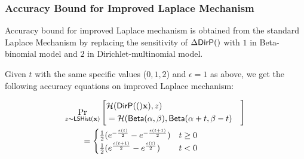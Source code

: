 \documentclass{article}
\begin{document}
\subsubsection{Accuracy Bound for Improved Laplace Mechanism}
\label{subsec_accuracy_lap}
Accuracy bound for improved Laplace mechanism is obtained from the standard Laplace Mechanism by replacing the sensitivity of $\Delta \bysinfer$ with $1$ in Beta-binomial model and $2$ in Dirichlet-multinomial model.

Given $t$ with the same specific values ($0,1,2$) and $\epsilon = 1$ as above, we get the following accuracy equations on improved Laplace mechanism:

\begin{align*}
&
\ilapmechPr{\dataobs}{
\begin{aligned}
\lefteqn{\hellinger(\bysinfer(\dataobs), z )}\\ 
&= \hellinger(\betad(\alpha, \beta), \betad(\alpha + t, \beta - t)
\end{aligned}
}
\\
&\qquad = 
\begin{cases}
\frac{1}{2} (e^{- \frac{\epsilon (t)}{2}} - e^{- \frac{\epsilon (t + 1)}{2}}) &  t \geq 0\\
\frac{1}{2} (e^{\frac{\epsilon (t + 1)}{2}} - e^{\frac{\epsilon (t)}{2}}) & t < 0
\end{cases}
\end{align*}
%
%
%
\end{document}
